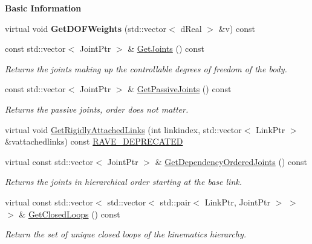 \begin{Indent}{\bf Basic Information}
\begin{DoxyCompactItemize}
\item 
\hypertarget{classOpenRAVE_1_1KinBody_a6568e67c28b56bea234bcbdf78172ee6}{
virtual void {\bfseries GetDOFWeights} (std::vector$<$ dReal $>$ \&v) const }
\label{classOpenRAVE_1_1KinBody_a6568e67c28b56bea234bcbdf78172ee6}

\item 
\hypertarget{classOpenRAVE_1_1KinBody_a01fcab06f416b2ac3bac1385e09ff9bf}{
const std::vector$<$ JointPtr $>$ \& \hyperlink{classOpenRAVE_1_1KinBody_a01fcab06f416b2ac3bac1385e09ff9bf}{GetJoints} () const }
\label{classOpenRAVE_1_1KinBody_a01fcab06f416b2ac3bac1385e09ff9bf}

\begin{DoxyCompactList}\small\item\em Returns the joints making up the controllable degrees of freedom of the body. \item\end{DoxyCompactList}\item 
const std::vector$<$ JointPtr $>$ \& \hyperlink{classOpenRAVE_1_1KinBody_ab7ece8b3b39a3c9dcc61899dc8dc783e}{GetPassiveJoints} () const 
\begin{DoxyCompactList}\small\item\em Returns the passive joints, order does not matter. \item\end{DoxyCompactList}\item 
virtual void \hyperlink{classOpenRAVE_1_1KinBody_a2fc883be19068452aa218bf252c244b1}{GetRigidlyAttachedLinks} (int linkindex, std::vector$<$ LinkPtr $>$ \&vattachedlinks) const \hyperlink{namespaceOpenRAVE_af23fc4c2c72950a8c02f38ef71680bc6}{RAVE\_\-DEPRECATED}
\item 
virtual const std::vector$<$ JointPtr $>$ \& \hyperlink{classOpenRAVE_1_1KinBody_a23704d633d23272f467ea0a2ca5a5223}{GetDependencyOrderedJoints} () const 
\begin{DoxyCompactList}\small\item\em Returns the joints in hierarchical order starting at the base link. \item\end{DoxyCompactList}\item 
virtual const std::vector$<$ std::vector$<$ std::pair$<$ LinkPtr, JointPtr $>$ $>$ $>$ \& \hyperlink{classOpenRAVE_1_1KinBody_a6eb3b9da2ed2b9b8eec770f018bbeb19}{GetClosedLoops} () const 
\begin{DoxyCompactList}\small\item\em Return the set of unique closed loops of the kinematics hierarchy. \item\end{DoxyCompactList}\item 

\end{DoxyCompactItemize}
\end{Indent}
